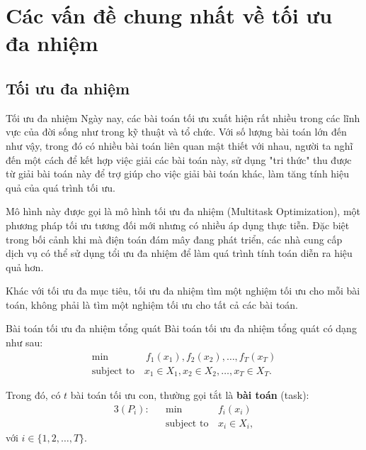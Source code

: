 \section{Các vấn đề chung nhất về tối ưu đa nhiệm} %
\label{sec:Các vấn đề chung nhất về tối ưu đa nhiệm}

\subsection{Tối ưu đa nhiệm} %
\label{sub:Tối ưu đa nhiệm}

\begin{frame}{Tối ưu đa nhiệm}
Ngày nay, các bài toán tối ưu xuất hiện rất nhiều trong các lĩnh vực của đời
sống như trong kỹ thuật và tổ chức. Với số lượng bài toán lớn đến như vậy, trong
đó có nhiều bài toán liên quan mật thiết với nhau, người ta nghĩ đến một cách để
kết hợp việc giải các bài toán này, sử dụng "tri thức" thu được từ giải bài toán
này để trợ giúp cho việc giải bài toán khác, làm tăng tính hiệu quả của quá
trình tối ưu.

Mô hình này được gọi là mô hình tối ưu đa nhiệm (Multitask Optimization), một
phương pháp tối ưu tương đối mới nhưng có nhiều áp dụng thực tiễn. Đặc biệt
trong bối cảnh khi mà điện toán đám mây đang phát triển, các nhà cung cấp dịch
vụ có thể sử dụng tổi ưu đa nhiệm để làm quá trình tính toán diễn ra hiệu quả
hơn.

Khác với tối ưu đa mục tiêu, tối ưu đa nhiệm tìm một nghiệm tối ưu cho mỗi bài
toán, không phải là tìm một nghiệm tối ưu cho tất cả các bài toán.
\end{frame}

\begin{frame}{Bài toán tối ưu đa nhiệm tổng quát}
  Bài toán tối ưu đa nhiệm tổng quát có dạng như sau:
\begin{align*}
  \min &\, f_{1}(x_{1}), f_{2}(x_{2}), \ldots , f_{T}(x_{T})\\
  \text{subject to}\, &x_{1} \in X_{1}, x_{2} \in X_{2},
  \ldots , x_{T} \in X_{T}.
\end{align*}

Trong đó, có \( t \) bài toán tối ưu con, thường gọi tắt là \textbf{bài toán}
(task):
\begin{alignat*}{3}
  (P_i):&&\min \, &f_i(x_i)\\
  \quad &&\text{subject to} \, &x_{i} \in X_{i}
,\end{alignat*}
với \( i \in \{1, 2, \ldots , T\}   \).

\end{frame}
